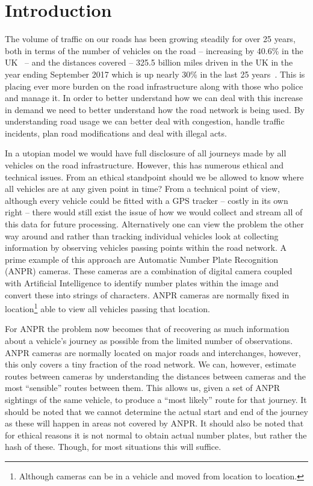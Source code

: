 \section{Introduction}

The volume of traffic on our roads has been growing steadily for over 25 years, both in terms of the number of vehicles on the road -- increasing by 40.6\% in the UK~\cite{noVehiocles} -- and the distances covered -- 325.5 billion miles driven in the UK in the year ending September 2017 which is up nearly 30\% in the last 25 years~\cite{distance}. This is placing ever more burden on the road infrastructure along with those who police and manage it. In order to better understand how we can deal with this increase in demand we need to better understand how the road network is being used. By understanding road usage we can better deal with congestion, handle traffic incidents, plan road modifications and deal with illegal acts.

In a utopian model we would have full disclosure of all journeys made by all vehicles on the road infrastructure. However, this has numerous ethical and technical issues. From an ethical standpoint should we be allowed to know where all vehicles are at any given point in time? From a technical point of view, although every vehicle could be fitted with a GPS tracker -- costly in its own right -- there would still exist the issue of how we would collect and stream all of this data for future processing. Alternatively one can view the problem the other way around and rather than tracking individual vehicles look at collecting information by observing vehicles passing points within the road network. A prime example of this approach are Automatic Number Plate Recognition (ANPR) cameras. These cameras are a combination of digital camera coupled with Artificial Intelligence to identify number plates within the image and convert these into strings of characters. ANPR cameras are normally fixed in location\footnote{Although cameras can be in a vehicle and moved from location to location.} able to view all vehicles passing that location.

For ANPR the problem now becomes that of recovering as much information about a vehicle's journey as possible from the limited number of observations. ANPR cameras are normally located on major roads and interchanges, however, this only covers a tiny fraction of the road network. We can, however, estimate routes between cameras by understanding the distances between cameras and the most ``sensible'' routes between them. This allows us, given a set of ANPR sightings of the same vehicle, to produce a ``most likely'' route for that journey. It should be noted that we cannot determine the actual start and end of the journey as these will happen in areas not covered by ANPR. It should also be noted that for ethical reasons it is not normal to obtain actual number plates, but rather the hash of these. Though, for most situations this will suffice.

